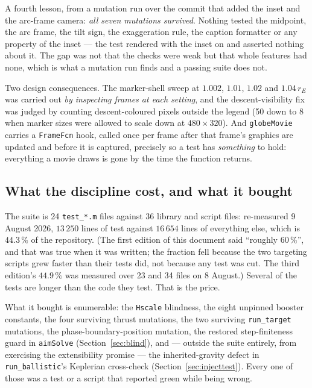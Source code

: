 \documentclass[11pt]{article}
\newcommand{\code}[1]{\texttt{#1}}
\begin{document}
A fourth lesson, from a mutation run over the commit that added the inset and
the arc-frame camera: \emph{all seven mutations survived}. Nothing tested the
midpoint, the arc frame, the tilt sign, the exaggeration rule, the caption
formatter or any property of the inset --- the test rendered with the inset on
and asserted nothing about it. The gap was not that the checks were weak but
that whole features had none, which is what a mutation run finds and a passing
suite does not.

Two design consequences. The marker-shell sweep at $1.002$, $1.01$, $1.02$ and
$1.04\,r_E$ was carried out \emph{by inspecting frames at each setting}, and
the descent-visibility fix was judged by counting descent-coloured pixels
outside the legend (50 down to 8 when marker sizes were allowed to scale down
at $480\times320$). And \code{globeMovie} carries a \code{FrameFcn} hook,
called once per frame after that frame's graphics are updated and before it is
captured, precisely so a test has \emph{something} to hold: everything a movie
draws is gone by the time the function returns.

\subsection{What the discipline cost, and what it bought}

The suite is 24 \code{test\_*.m} files against 36 library and script files:
re-measured 9 August 2026, $13\,250$ lines of test against $16\,654$ lines of
everything else, which is $44.3\,\%$ of the repository. (The first edition of
this document said ``roughly $60\,\%$'', and that was true when it was written;
the fraction fell because the two targeting scripts grew faster than their tests
did, not because any test was cut. The third edition's $44.9\,\%$ was measured
over 23 and 34 files on 8 August.) Several of the tests are longer than the code
they test. That is the price.

What it bought is enumerable: the \code{Hscale} blindness, the eight unpinned
booster constants, the four surviving thrust mutations, the two surviving
\code{run\_target} mutations, the phase-boundary-position mutation, the
restored step-finiteness guard in \code{aimSolve}
(Section~\ref{sec:blind}), and --- outside the suite entirely, from exercising
the extensibility promise --- the inherited-gravity defect in
\code{run\_ballistic}'s Keplerian cross-check
(Section~\ref{sec:injecttest}). Every one of those was a test or a script that
reported green while being wrong.
\end{document}
